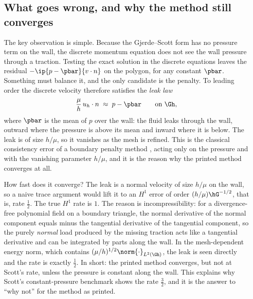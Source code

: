 \subsection{What goes wrong, and why the method still converges}
The key observation is simple. Because the Gjerde--Scott form has no pressure term on the wall, the discrete momentum equation does not see the wall pressure through a traction. Testing the exact solution in the discrete equations leaves the residual $-\ip{p-\pbar}{v\cdot n}$ on the polygon, for any constant $\pbar$. Something must balance it, and the only candidate is the penalty. To leading order the discrete velocity therefore satisfies the \emph{leak law}
\[
\frac\mu h\,u_h\cdot n\;\approx\;p-\pbar\qquad\text{on }\Gh ,
\]
where $\pbar$ is the mean of $p$ over the wall: the fluid leaks through the wall, outward where the pressure is above its mean and inward where it is below. The leak is of size $h/\mu$, so it vanishes as the mesh is refined. This is the classical consistency error of a boundary penalty method \cite{Babuska1973}, acting only on the pressure and with the vanishing parameter $h/\mu$, and it is the reason why the printed method converges at all.

How fast does it converge? The leak is a normal velocity of size $h/\mu$ on the wall, so a naive trace argument would lift it to an $H^1$ error of order $(h/\mu)\hG^{-1/2}$, that is, rate $\frac12$. The true $H^1$ rate is $1$. The reason is incompressibility: for a divergence-free polynomial field on a boundary triangle, the normal derivative of the normal component equals minus the tangential derivative of the tangential component, so the purely \emph{normal} load produced by the missing traction acts like a tangential derivative and can be integrated by parts along the wall. In the mesh-dependent energy norm, which contains $(\mu/h)^{1/2}\norm{\cdot}_{L^2(\Gh)}$, the leak is seen directly and the rate is exactly $\frac12$. In short: the printed method converges, but not at Scott's rate, unless the pressure is constant along the wall. This explains why Scott's constant-pressure benchmark shows the rate $\frac32$, and it is the answer to ``why not'' for the method as printed.

